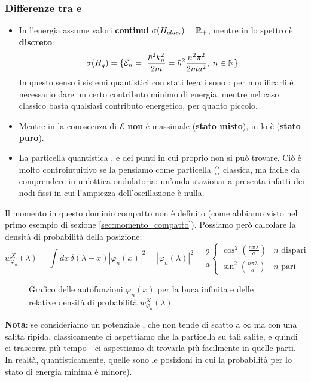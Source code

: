 \documentclass[../../FisicaTeorica.tex]{subfiles}
\begin{document}
\subsubsection{Differenze tra \MC e \MQ}
\begin{itemize}
\item In \MC l'energia assume valori \textbf{continui} $\sigma(H_{clas.})=\mathbb{R}_+$, mentre in \MQ lo spettro è \textbf{discreto}:
\[
\sigma(H_q)=\{\mathcal{E}_n =\ \frac{\hbar^2 k_n^2}{2m} = \hbar^2 \frac{n^2 \pi^2}{2m a^2}, \> n\in \mathbb{N}\}
\]
In questo senso i sistemi quantistici con stati legati sono : per modificarli è necessario dare un certo contributo minimo di energia, mentre nel caso classico basta qualsiasi contributo energetico, per quanto piccolo.
\item Mentre in \MC la conoscenza di $\mathcal{E}$ \textbf{non} è massimale (\textbf{stato misto}), in \MQ lo è (\textbf{stato puro}).
\item La particella quantistica , e dei punti in cui proprio non si può trovare. Ciò è molto controintuitivo se la pensiamo come particella () classica, ma facile da comprendere in un'ottica ondulatoria: un'onda stazionaria presenta infatti dei nodi fissi in cui l'ampiezza dell'oscillazione è nulla.
\end{itemize}
Il momento in questo dominio compatto non è definito (come abbiamo visto nel primo esempio di sezione \ref{sec:momento_compatto}). Possiamo però calcolare la densità di probabilità della posizione:
\[
w_{\varphi_n}^X(\lambda) = \int dx\, \delta(\lambda-x) |\varphi_n(x)|^2 = |\varphi_n(\lambda)|^2 = \frac{2}{a}\begin{cases}
\cos^2 \left(\frac{n\pi \lambda}{a}\right) & n \text{ dispari }\\
\sin^2\left(\frac{n\pi \lambda}{a}\right) & n \text{ pari}
\end{cases}
\]
\begin{figure}[H]
    \centering
    
    \caption{Grafico delle autofunzioni $\varphi_n(x)$ per la buca infinita e delle relative densità di probabilità $w_{\varphi_n}^X(\lambda)$}
    \label{fig:plot_bucainfinita}
\end{figure}

\textbf{Nota}: se consideriamo un potenziale , che non tende di scatto a $\infty$ ma  con una salita ripida, classicamente ci aspettiamo che la particella  su tali salite, e quindi ci trascorra più tempo - ci aspettiamo di trovarla più facilmente in quelle parti. In realtà, quantisticamente, quelle sono le posizioni in cui la probabilità per lo stato di energia minima è minore).\\
\end{document}
